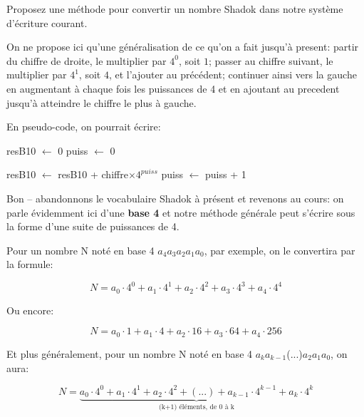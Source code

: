 \documentclass[12pt]{article}
\begin{document}
	\begin{MonExo}
		Proposez une méthode pour convertir un nombre Shadok dans notre système d'écriture courant.
	\end{MonExo}
	
	\begin{MaReponse}
		On ne propose ici qu'une généralisation de ce qu'on a fait jusqu'à present: partir du chiffre de droite, le multiplier par $4^0$, soit $1$; passer au chiffre suivant, le multiplier par $4^1$, soit $4$, et l'ajouter au précédent; continuer ainsi vers la gauche en augmentant à chaque fois les puissances de 4 et en ajoutant au precedent jusqu'à atteindre le chiffre le plus à gauche.

		En pseudo-code, on pourrait écrire:
		
		\begin{algorithmic}[1]
			\State resB10 $\leftarrow$ 0
			\State puiss $\leftarrow$ 0

			
			\State resB10 $\leftarrow$ resB10 + chiffre$\times 4^{puiss}$
			\State puiss $\leftarrow$ puiss + 1
			\EndFor
			\State{}
			\EndFunction
		\end{algorithmic}
	\end{MaReponse}
	
		
	Bon -- abandonnons le vocabulaire Shadok à présent et revenons au cours: on parle évidemment ici d'une \textbf{base 4} et notre méthode générale peut s'écrire sous la forme d'une suite de puissances de 4.
	
	Pour un nombre N noté en base 4 \( a_4 \)\( a_3 \)\( a_2 \)\( a_1 \)\( a_0 \), par exemple, on le convertira par la formule:
	
	\[ N = a_0 \cdot 4^0 + a_1 \cdot 4^1 + a_2 \cdot 4^2 + a_3 \cdot 4^3 + a_4 \cdot 4^4\]
	
	Ou encore:
	
	\[ N = a_0 \cdot 1 + a_1 \cdot 4 + a_2 \cdot 16 + a_3 \cdot 64 + a_4 \cdot 256\]
	
	Et plus généralement, pour un nombre N noté en base 4 \( a_k \)\( a_{k-1} \)(...)\( a_2 \)\( a_1 \)\( a_0 \), on aura:
	
	\[ N = \underbrace{a_0 \cdot 4^0 + a_1 \cdot 4^1 + a_2 \cdot 4^2 + (...) + a_{k-1} \cdot 4^{k-1} + a_k \cdot 4^k}_{\text{(k+1)\ éléments, de 0 à k}}\]
	
\end{document}
